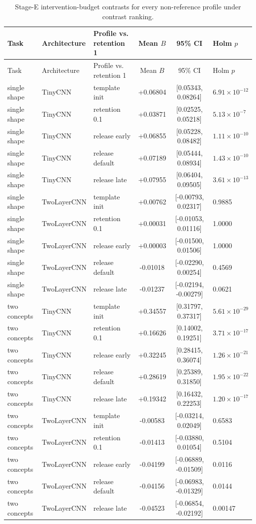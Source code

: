 {
\small
\setlength{\tabcolsep}{3.5pt}
\begin{longtable}{lllccl}
\caption{Stage-E intervention-budget contrasts for every non-reference profile under contrast ranking.}\label{tab:stage-e-profiles}\\
\toprule
Task & Architecture & Profile vs. retention 1 & Mean $B$ & 95\% CI & Holm $p$ \\
\midrule
\endfirsthead
\toprule
Task & Architecture & Profile vs. retention 1 & Mean $B$ & 95\% CI & Holm $p$ \\
\midrule
\endhead
\bottomrule
\endfoot
single shape & TinyCNN & template init & +0.06804 & [0.05343, 0.08264] & $6.91\times10^{-12}$ \\
single shape & TinyCNN & retention 0.1 & +0.03871 & [0.02525, 0.05218] & $5.13\times10^{-7}$ \\
single shape & TinyCNN & release early & +0.06855 & [0.05228, 0.08482] & $1.11\times10^{-10}$ \\
single shape & TinyCNN & release default & +0.07189 & [0.05444, 0.08934] & $1.43\times10^{-10}$ \\
single shape & TinyCNN & release late & +0.07955 & [0.06404, 0.09505] & $3.61\times10^{-13}$ \\
single shape & TwoLayerCNN & template init & +0.00762 & [-0.00793, 0.02317] & 0.9885 \\
single shape & TwoLayerCNN & retention 0.1 & +0.00031 & [-0.01053, 0.01116] & 1.0000 \\
single shape & TwoLayerCNN & release early & +0.00003 & [-0.01500, 0.01506] & 1.0000 \\
single shape & TwoLayerCNN & release default & -0.01018 & [-0.02290, 0.00254] & 0.4569 \\
single shape & TwoLayerCNN & release late & -0.01237 & [-0.02194, -0.00279] & 0.0621 \\
two concepts & TinyCNN & template init & +0.34557 & [0.31797, 0.37317] & $5.61\times10^{-29}$ \\
two concepts & TinyCNN & retention 0.1 & +0.16626 & [0.14002, 0.19251] & $3.71\times10^{-17}$ \\
two concepts & TinyCNN & release early & +0.32245 & [0.28415, 0.36074] & $1.26\times10^{-21}$ \\
two concepts & TinyCNN & release default & +0.28619 & [0.25389, 0.31850] & $1.95\times10^{-22}$ \\
two concepts & TinyCNN & release late & +0.19342 & [0.16432, 0.22253] & $1.20\times10^{-17}$ \\
two concepts & TwoLayerCNN & template init & -0.00583 & [-0.03214, 0.02049] & 0.6583 \\
two concepts & TwoLayerCNN & retention 0.1 & -0.01413 & [-0.03880, 0.01054] & 0.5104 \\
two concepts & TwoLayerCNN & release early & -0.04199 & [-0.06889, -0.01509] & 0.0116 \\
two concepts & TwoLayerCNN & release default & -0.04156 & [-0.06983, -0.01329] & 0.0144 \\
two concepts & TwoLayerCNN & release late & -0.04523 & [-0.06854, -0.02192] & 0.00147 \\
\end{longtable}
\normalsize
}

